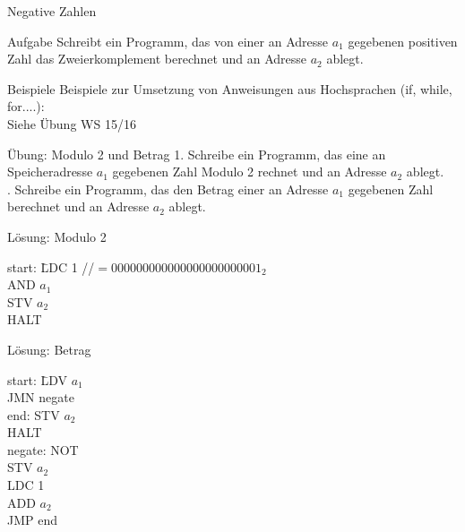 \begin{frame}{Negative Zahlen}
	\begin{block}{Aufgabe}
		Schreibt ein Programm, das von einer an Adresse $a_1$ gegebenen positiven Zahl das Zweierkomplement berechnet und an Adresse $a_2$ ablegt.
	\end{block}

\end{frame}

\begin{frame}{Beispiele}
	Beispiele zur Umsetzung von Anweisungen aus Hochsprachen (if, while, for....):\\
	Siehe Übung WS 15/16
\end{frame}

\begin{frame}{Übung: Modulo 2 und Betrag}
	1. Schreibe ein Programm, das eine an Speicheradresse $a_1$ gegebenen Zahl Modulo 2 rechnet und an Adresse $a_2$ ablegt. \\
	. Schreibe ein Programm, das den Betrag einer an Adresse $a_1$ gegebenen Zahl berechnet und an Adresse $a_2$ ablegt.
\end{frame}

\begin{frame}{Lösung: Modulo 2}
	\begin{tabbing}
		start: \; \= LDC 1 \quad  //$= 000000000000000000000001_2$ \\
				\> AND $a_1$ \\
				\> STV $a_2$ \\
				\> HALT
	\end{tabbing}
\end{frame}

\begin{frame}{Lösung: Betrag}
	\begin{tabbing}
		start: \quad \= LDV $a_1$ \\
					 \> JMN negate \\
		end: 		 \> STV $a_2$ \\
					 \> HALT \\
		negate:		 \> NOT \\
					 \> STV $a_2$ \\
					 \> LDC 1 \\
					 \> ADD $a_2$  \\
					 \> JMP end	 \\		 
	\end{tabbing}
\end{frame}

